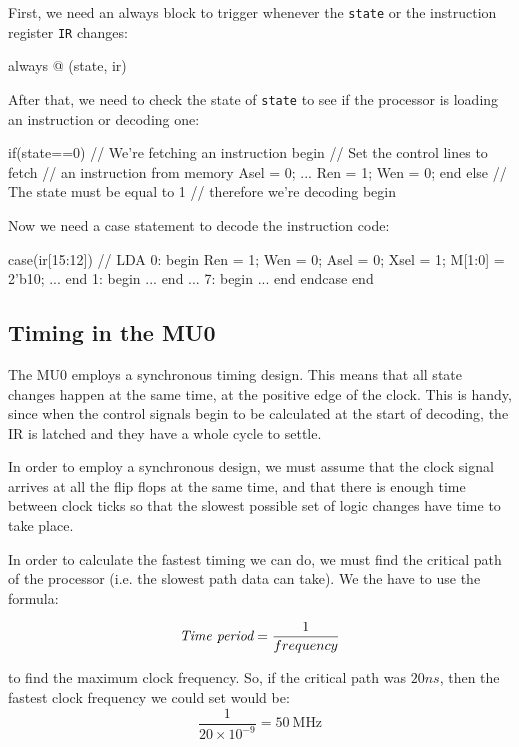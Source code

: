 First, we need an always block to trigger whenever the {\tt state} or the
instruction register {\tt IR} changes:

\begin{listing}{1}
always @ (state, ir)
\end{listing}

After that, we need to check the state of {\tt state} to see if the processor is
loading an instruction or decoding one:

\begin{listingcont}
	if(state==0)
		// We're fetching an instruction
		begin
		// Set the control lines to fetch
		// an instruction from memory
		Asel = 0;
		...
		Ren = 1;
		Wen = 0;
		end
	else 	// The state must be equal to 1 
			// therefore we're decoding
		begin
\end{listingcont}

Now we need a case statement to decode the instruction code:

\begin{listingcont}
	case(ir[15:12])
		// LDA
		0: 	begin
			Ren = 1;
			Wen = 0;
			Asel = 0;
			Xsel = 1;
			M[1:0] = 2'b10;
			...
			end
		1:	begin
			...
			end
		...
		7:	begin
			...
			end
	endcase
end
\end{listingcont}

\subsection{Timing in the MU0}

The MU0 employs a synchronous timing design. This means that all state changes
happen at the same time, at the positive edge of the clock. This is handy, since
when the control signals begin to be calculated at the start of decoding, the IR
is latched and they have a whole cycle to settle.

In order to employ a synchronous design, we must assume that the clock signal
arrives at all the flip flops at the same time, and that there is enough time
between clock ticks so that the slowest possible set of logic changes have time
to take place.

In order to calculate the fastest timing we can do, we must find the critical
path of the processor (i.e. the slowest path data can take). We the have to use
the formula:

\[
	\textrm{\it Time period} = \frac{1}{frequency}
\]

to find the maximum clock frequency. So, if the critical path was $20ns$, then
the fastest clock frequency we could set would be:
\[
	\frac{1}{20\times10^{-9}} = \SI{50}{\mega\hertz}
\]

